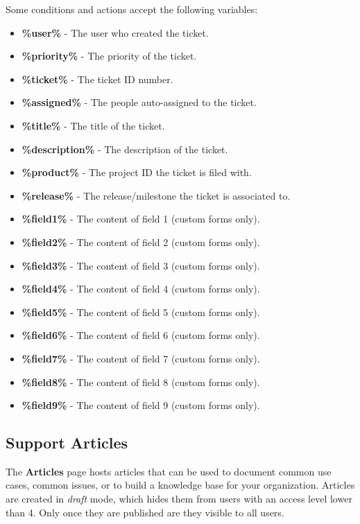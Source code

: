 \documentclass[11pt]{article}
\begin{document}
Some conditions and actions accept the following variables:

\begin{itemize}
\item \textbf{\%user\%} - The user who created the ticket.
\item \textbf{\%priority\%} - The priority of the ticket.
\item \textbf{\%ticket\%} - The ticket ID number.
\item \textbf{\%assigned\%} - The people auto-assigned to the ticket.
\item \textbf{\%title\%} - The title of the ticket.
\item \textbf{\%description\%} - The description of the ticket.
\item \textbf{\%product\%} - The project ID the ticket is filed with.
\item \textbf{\%release\%} - The release/milestone the ticket is associated to.
\item \textbf{\%field1\%} - The content of field 1 (custom forms only).
\item \textbf{\%field2\%} - The content of field 2 (custom forms only).
\item \textbf{\%field3\%} - The content of field 3 (custom forms only).
\item \textbf{\%field4\%} - The content of field 4 (custom forms only).
\item \textbf{\%field5\%} - The content of field 5 (custom forms only).
\item \textbf{\%field6\%} - The content of field 6 (custom forms only).
\item \textbf{\%field7\%} - The content of field 7 (custom forms only).
\item \textbf{\%field8\%} - The content of field 8 (custom forms only).
\item \textbf{\%field9\%} - The content of field 9 (custom forms only).
\end{itemize}

\subsection{Support Articles}
The \textbf{Articles} page hosts articles that can be used to document common use cases, common issues, or to build a knowledge base for your organization. Articles are created in \textit{draft} mode, which hides them from users with an access level lower than 4. Only once they are published are they visible to all users.
\end{document}
